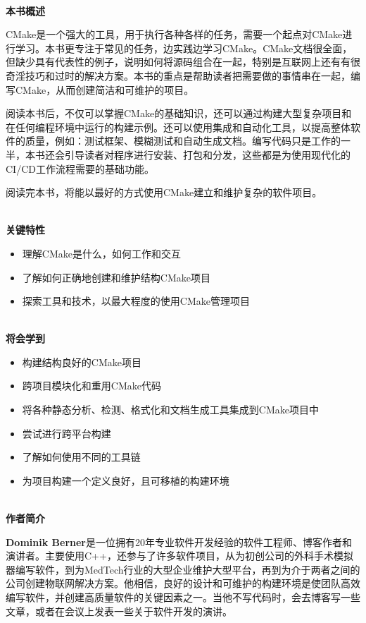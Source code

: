 \documentclass[11pt,a4paper,UTF8]{book}
\begin{document}
\begin{sloppypar}
	\hspace*{\fill} \\ %
	\noindent\textbf{本书概述}
	
	CMake是一个强大的工具，用于执行各种各样的任务，需要一个起点对CMake进行学习。本书更专注于常见的任务，边实践边学习CMake。CMake文档很全面，但缺少具有代表性的例子，说明如何将源码组合在一起，特别是互联网上还有有很奇淫技巧和过时的解决方案。本书的重点是帮助读者把需要做的事情串在一起，编写CMake，从而创建简洁和可维护的项目。
	
	阅读本书后，不仅可以掌握CMake的基础知识，还可以通过构建大型复杂项目和在任何编程环境中运行的构建示例。还可以使用集成和自动化工具，以提高整体软件的质量，例如：测试框架、模糊测试和自动生成文档。编写代码只是工作的一半，本书还会引导读者对程序进行安装、打包和分发，这些都是为使用现代化的CI/CD工作流程需要的基础功能。
	
	阅读完本书，将能以最好的方式使用CMake建立和维护复杂的软件项目。
	
	
	\hspace*{\fill} \\ %
	\noindent\textbf{关键特性}
	\begin{itemize}
		\item 理解CMake是什么，如何工作和交互
		\item 了解如何正确地创建和维护结构CMake项目
		\item 探索工具和技术，以最大程度的使用CMake管理项目
	\end{itemize}

	\hspace*{\fill} \\ %
	\noindent\textbf{将会学到}
	\begin{itemize}
		\item 构建结构良好的CMake项目
		\item 跨项目模块化和重用CMake代码
		\item 将各种静态分析、检测、格式化和文档生成工具集成到CMake项目中
		\item 尝试进行跨平台构建
		\item 了解如何使用不同的工具链
		\item 为项目构建一个定义良好，且可移植的构建环境
	\end{itemize}
	
	\hspace*{\fill} \\ %
	\noindent\textbf{作者简介}
	
	\textbf{Dominik Berner}是一位拥有20年专业软件开发经验的软件工程师、博客作者和演讲者。主要使用C++，还参与了许多软件项目，从为初创公司的外科手术模拟器编写软件，到为MedTech行业的大型企业维护大型平台，再到为介于两者之间的公司创建物联网解决方案。他相信，良好的设计和可维护的构建环境是使团队高效编写软件，并创建高质量软件的关键因素之一。当他不写代码时，会去博客写一些文章，或者在会议上发表一些关于软件开发的演讲。
	

\end{sloppypar}
\end{document}
